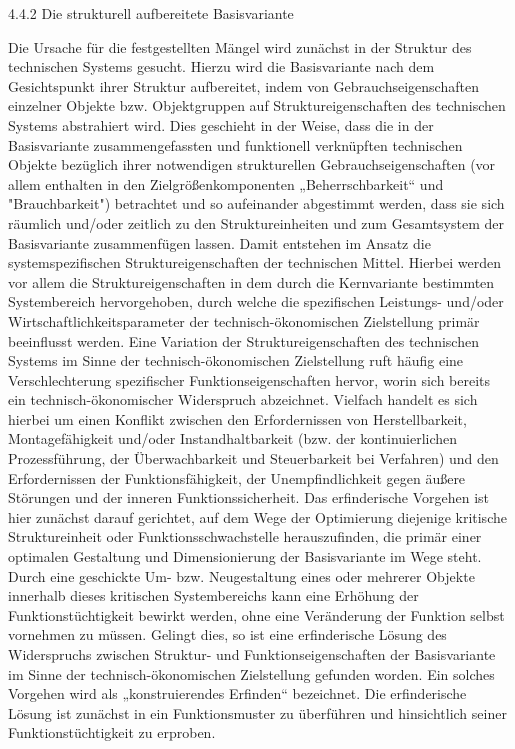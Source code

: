 \documentclass[12pt,a4paper]{article}
\begin{document}
4.4.2  Die strukturell aufbereitete Basisvariante

Die Ursache für die festgestellten Mängel wird zunächst in der Struktur des
technischen Systems gesucht. Hierzu wird die Basisvariante nach dem
Gesichtspunkt ihrer Struktur aufbereitet, indem von Gebrauchseigenschaften
einzelner Objekte bzw. Objektgruppen auf Struktureigenschaften des technischen
Systems abstrahiert wird. Dies geschieht in der Weise, dass die in der
Basisvariante zusammengefassten und funktionell verknüpften technischen
Objekte bezüglich ihrer notwendigen strukturellen Gebrauchseigenschaften (vor
allem enthalten in den Zielgrößenkomponenten „Beherrschbarkeit“ und
"Brauchbarkeit") betrachtet und so aufeinander abgestimmt werden, dass sie
sich räumlich und/oder zeitlich zu den Struktureinheiten und zum Gesamtsystem
der Basisvariante zusammenfügen lassen. Damit entstehen im Ansatz die
systemspezifischen Struktureigenschaften der technischen Mittel. Hierbei
werden vor allem die Struktureigenschaften in dem durch die Kernvariante
bestimmten Systembereich hervorgehoben, durch welche die spezifischen
Leistungs- und/oder Wirtschaftlichkeitsparameter der technisch-ökonomischen
Zielstellung primär beeinflusst werden. Eine Variation der
Struktureigenschaften des technischen Systems im Sinne der
technisch-ökonomischen Zielstellung ruft häufig eine Verschlechterung
spezifischer Funktionseigenschaften hervor, worin sich bereits ein
technisch-ökonomischer Widerspruch abzeichnet. Vielfach handelt es sich
hierbei um einen Konflikt zwischen den Erfordernissen von Herstellbarkeit,
Montagefähigkeit und/oder Instandhaltbarkeit (bzw. der kontinuierlichen
Prozessführung, der Überwachbarkeit und Steuerbarkeit bei Verfahren) und den
Erfordernissen der Funktionsfähigkeit, der Unempfindlichkeit gegen äußere
Störungen und der inneren Funktionssicherheit. Das erfinderische Vorgehen ist
hier zunächst darauf gerichtet, auf dem Wege der Optimierung diejenige
kritische Struktureinheit oder Funktionsschwachstelle herauszufinden, die
primär einer optimalen Gestaltung und Dimensionierung der Basisvariante im
Wege steht. Durch eine geschickte Um- bzw. Neugestaltung eines oder mehrerer
Objekte innerhalb dieses kritischen Systembereichs kann eine Erhöhung der
Funktionstüchtigkeit bewirkt werden, ohne eine Veränderung der Funktion selbst
vornehmen zu müssen. Gelingt dies, so ist eine erfinderische Lösung des
Widerspruchs zwischen Struktur- und Funktionseigenschaften der Basisvariante
im Sinne der technisch-ökonomischen Zielstellung gefunden worden. Ein solches
Vorgehen wird als „konstruierendes Erfinden“ bezeichnet. Die erfinderische
Lösung ist zunächst in ein Funktionsmuster zu überführen und hinsichtlich
seiner Funktionstüchtigkeit zu erproben.
\end{document}
